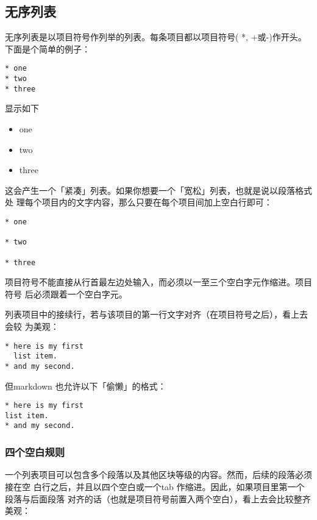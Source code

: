 \documentclass[fancyhdr,bookmark]{ctexbook}
\providecommand{\tightlist}{%
  \setlength{\itemsep}{0pt}\setlength{\parskip}{0pt}}
\begin{document}
\subsection{无序列表}\label{ux65e0ux5e8fux5217ux8868}

无序列表是以项目符号作列举的列表。每条项目都以项目符号( *, +或-)作开头。
下面是个简单的例子：

\begin{lstlisting}
* one
* two
* three
\end{lstlisting}

显示如下

\begin{itemize}
\tightlist
\item
  one
\item
  two
\item
  three
\end{itemize}

这会产生一个「紧凑」列表。如果你想要一个「宽松」列表，也就是说以段落格式处
理每个项目内的文字内容，那么只要在每个项目间加上空白行即可：

\begin{lstlisting}
* one

* two

* three
\end{lstlisting}

项目符号不能直接从行首最左边处输入，而必须以一至三个空白字元作缩进。项目符号
后必须跟着一个空白字元。

列表项目中的接续行，若与该项目的第一行文字对齐（在项目符号之后），看上去会较
为美观：

\begin{lstlisting}
* here is my first
  list item.
* and my second.
\end{lstlisting}

但markdown 也允许以下「偷懒」的格式：

\begin{lstlisting}
* here is my first
list item.
* and my second.
\end{lstlisting}

\subsubsection{四个空白规则}\label{ux56dbux4e2aux7a7aux767dux89c4ux5219}

一个列表项目可以包含多个段落以及其他区块等级的内容。然而，后续的段落必须接在空
白行之后，并且以四个空白或一个tab
作缩进。因此，如果项目里第一个段落与后面段落
对齐的话（也就是项目符号前置入两个空白），看上去会比较整齐美观：
\end{document}
